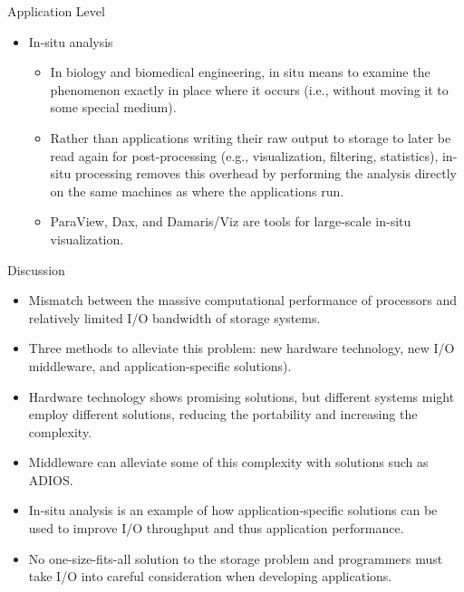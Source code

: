 \documentclass[compress,11pt,xcolor=svgnames,aspectratio=169]{beamer}
\begin{document}
\begin{frame}[t]{Application Level}

\begin{itemize}

\item In-situ analysis\\[0.4cm]

    \begin{itemize}
    \setlength\itemsep{0.6cm}

    \item In biology and biomedical engineering, in situ means to examine the phenomenon exactly in place where it occurs (i.e., without moving it to some special medium).

    \item Rather than applications writing their raw output to storage to later be read again for post-processing (e.g., visualization, filtering, statistics), in-situ processing removes this overhead by performing the analysis directly on the same machines as where the applications run.

    \item ParaView, Dax, and Damaris/Viz are tools for large-scale in-situ visualization.

    \end{itemize}

\end{itemize}

\nocite{3372390}

\end{frame}

\begin{frame}[t]{Discussion}

\begin{itemize}

\item Mismatch between the massive computational performance of processors and relatively limited I/O bandwidth of storage systems.

\item Three methods to alleviate this problem: new hardware technology, new I/O middleware, and application-specific solutions).

\item Hardware technology shows promising solutions, but different systems might employ different solutions, reducing the portability and increasing the complexity. %

\item Middleware can alleviate some of this complexity with solutions such as ADIOS.

\item In-situ analysis is an example of how application-specific solutions can be used to improve I/O throughput and thus application performance.

\item No one-size-fits-all solution to the storage problem and programmers must take I/O into careful consideration when developing applications.

\end{itemize}

\nocite{3372390}

\end{frame}
\end{document}

